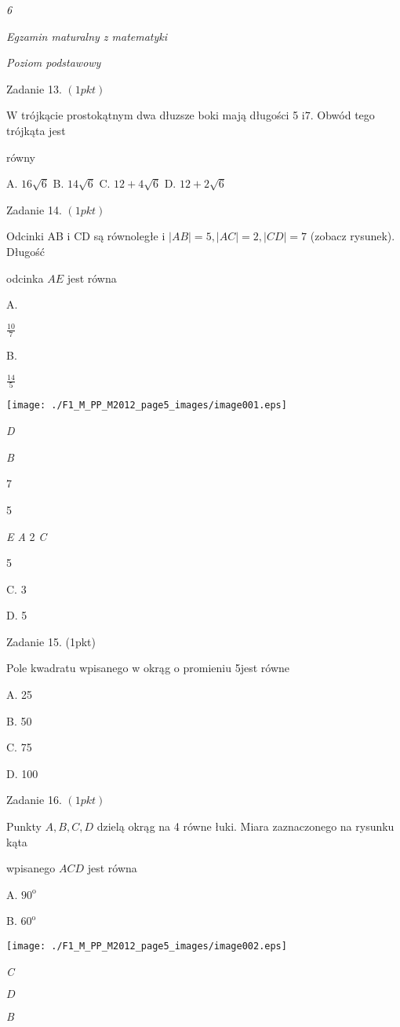 \documentclass[a4paper,12pt]{article}
\begin{document}
{\it 6}

{\it Egzamin maturalny z matematyki}

{\it Poziom podstawowy}

Zadanie 13. $(1pkt)$

$\mathrm{W}$ trójkącie prostokątnym dwa dłuzsze boki mają długości 5 $\mathrm{i}7$. Obwód tego trójkąta jest

równy

A. $16\sqrt{6}$ B. $14\sqrt{6}$ C. $12+4\sqrt{6}$ D. $12+2\sqrt{6}$

Zadanie 14. $(1pkt)$

Odcinki AB $\mathrm{i}$ CD są równoległe i $|AB|=5, |AC|=2, |CD|=7$ (zobacz rysunek). Długość

odcinka $AE$ jest równa

A.

$\displaystyle \frac{10}{7}$

B.

$\displaystyle \frac{14}{5}$
\begin{center}
\texttt{[image: ./F1\_M\_PP\_M2012\_page5\_images/image001.eps]}
\end{center}
{\it D}

{\it B}

7

5

{\it E  A} 2  {\it C}

5

C. 3

D. 5

Zadanie 15. (1pkt)

Pole kwadratu wpisanego w okrąg o promieniu 5jest równe

A. 25

B. 50

C. 75

D. 100

Zadanie 16. $(1pkt)$

Punkty $A, B, C, D$ dzielą okrąg na 4 równe łuki. Miara zaznaczonego na rysunku kąta

wpisanego $ACD$ jest równa

A. $90^{\mathrm{o}}$

B. $60^{\mathrm{o}}$
\begin{center}
\texttt{[image: ./F1\_M\_PP\_M2012\_page5\_images/image002.eps]}
\end{center}
{\it C}

$D$

{\it B}
\end{document}
